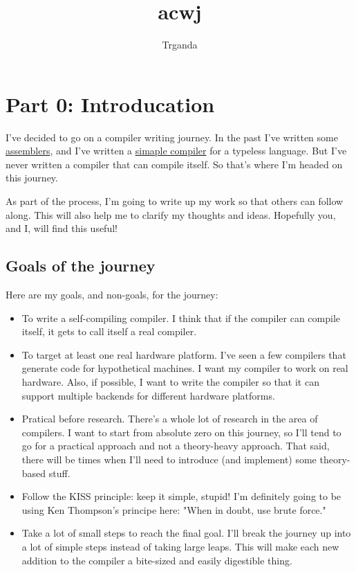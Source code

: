 \documentclass[a4paper,12pt]{article}
\title{acwj}
\author{Trganda}
\begin{document}
\maketitle

\section{Part 0: Introducation}

I've decided to go on a compiler writing journey.
In the past I've written some \href{https://github.com/DoctorWkt/pdp7-unix/blob/master/tools/as7}{assemblers},
and I've written a \href{https://github.com/DoctorWkt/h-compiler}{simaple compiler} for a typeless language.
But I've never written a compiler that can compile itself.
So that's where I'm headed on this journey.

As part of the process, I'm going to write up my work so that others can follow along.
This will also help me to clarify my thoughts and ideas. Hopefully you, and I, will find this useful!

\subsection{Goals of the journey}

Here are my goals, and non-goals, for the journey:

\begin{itemize}
    \item To write a self-compiling compiler. I think that if the compiler can compile itself, it gets to call itself a real compiler.
    \item To target at least one real hardware platform. I've seen a few compilers that generate code for hypothetical machines.
          I want my compiler to work on real hardware. Also, if possible, I want to write the compiler so that it can support multiple backends for different hardware platforms.
    \item Pratical before research. There's a whole lot of research in the area of compilers. I want to start from absolute zero on this journey, so I'll tend to go for a practical approach and not a theory-heavy approach. That said, there will be times when I'll need to introduce (and implement) some theory-based stuff.
    \item Follow the KISS principle: keep it simple, stupid! I'm definitely going to be using Ken Thompson's principe here: "When in doubt, use brute force."
    \item Take a lot of small steps to reach the final goal. I'll break the journey up into a lot of simple steps instead of taking large leaps. This will make each new addition to the compiler a bite-sized and easily digestible thing.
\end{itemize}
\end{document}
